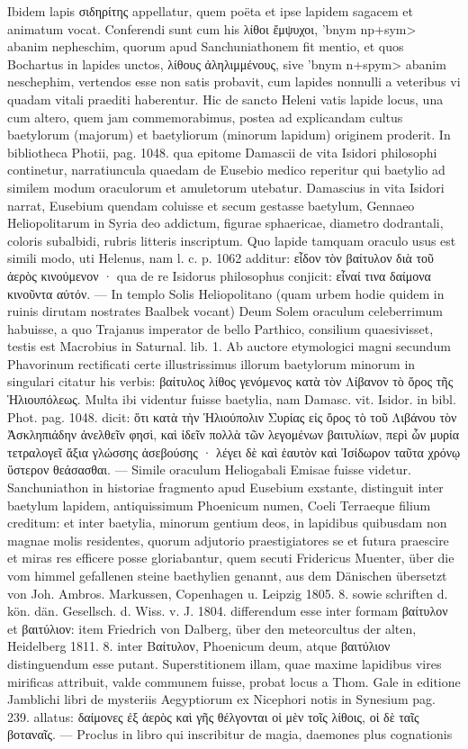 \documentclass[a4paper, 11pt, oneside, polutonikogreek, german]{article}
\begin{document}
\hspace*{0mm}Ibidem lapis σιδηρίτης appellatur, quem poëta et ipse lapidem sagacem et animatum vocat. Conferendi sunt cum his λίθοι ἔμψυχοι, \<'bnym np+sym> abanim nepheschim, quorum apud Sanchuniathonem fit mentio, et quos Bochartus in lapides unctos, λίθους ἀληλιμμένους, sive \<'bnym n+spym> abanim neschephim, vertendos esse non satis probavit, cum lapides nonnulli a veteribus vi quadam vitali praediti haberentur. Hic de sancto Heleni vatis lapide locus, una cum altero, quem jam commemorabimus, postea ad explicandam cultus baetylorum (majorum) et baetyliorum (minorum lapidum) originem proderit. In bibliotheca Photii, pag. 1048. qua epitome Damascii de vita Isidori philosophi continetur, narratiuncula quaedam de Eusebio medico reperitur qui baetylio ad similem modum oraculorum et amuletorum utebatur. Damascius in vita Isidori narrat, Eusebium quendam coluisse et secum gestasse baetylum, Gennaeo Heliopolitarum in Syria deo addictum, figurae sphaericae, diametro dodrantali, coloris subalbidi, rubris litteris inscriptum. Quo lapide tamquam oraculo usus est simili modo, uti Helenus, nam l. c. p. 1062 additur: εἶδον τὸν βαίτυλον διὰ τοῦ ἀερὸς κινούμενον · qua de re Isidorus philosophus conjicit: εἶναί τινα δαίμονα κινοῦντα αὐτόν. --- In templo Solis Heliopolitano (quam urbem hodie quidem in ruinis dirutam nostrates Baalbek vocant) Deum Solem oraculum celeberrimum habuisse, a quo Trajanus imperator de bello Parthico, consilium quaesivisset, testis est Macrobius in Saturnal. lib. 1. Ab auctore etymologici magni secundum Phavorinum rectificati certe illustrissimus illorum baetylorum minorum in singulari citatur his verbis: βαίτυλος λίθος γενόμενος κατὰ τὸν Λίβανον τὸ ὄρος τῆς Ἡλιουπόλεως. Multa ibi videntur fuisse baetylia, nam Damasc. vit. Isidor. in bibl. Phot. pag. 1048. dicit: ὅτι κατὰ τὴν Ἡλιούπολιν Συρίας εἰς ὄρος τὸ τοῦ Λιβάνου τὸν Ἀσκληπιάδην ἀνελθεῖν φησὶ, καὶ ἰδεῖν πολλὰ τῶν λεγομένων βαιτυλίων, περὶ ὧν μυρία τετραλογεῖ ἄξια γλώσσης ἀσεβούσης · λέγει δὲ καὶ ἑαυτὸν καὶ Ἰσίδωρον ταῦτα χρόνῳ ὕστερον θεάσασθαι. --- Simile oraculum Heliogabali Emisae fuisse videtur. Sanchuniathon in historiae fragmento apud Eusebium exstante, distinguit inter baetylum lapidem, antiquissimum Phoenicum numen, Coeli Terraeque filium creditum: et inter baetylia, minorum gentium deos, in lapidibus quibusdam non magnae molis residentes, quorum adjutorio praestigiatores se et futura praescire et miras res efficere posse gloriabantur, quem secuti Fridericus Muenter, über die vom himmel gefallenen steine baethylien genannt, aus dem Dänischen übersetzt von Joh. Ambros. Markussen, Copenhagen u. Leipzig 1805. 8. sowie schriften d. kön. dän. Gesellsch. d. Wiss. v. J. 1804. differendum esse inter formam βαίτυλον et βαιτύλιον: item Friedrich von Dalberg, über den meteorcultus der alten, Heidelberg 1811. 8. inter Βαίτυλον, Phoenicum deum, atque βαιτύλιον distinguendum esse putant. Superstitionem illam, quae maxime lapidibus vires mirificas attribuit, valde communem fuisse, probat locus a Thom. Gale in editione Jamblichi libri de mysteriis Aegyptiorum ex Nicephori notis in Synesium pag. 239. allatus: δαίμονες ἐξ ἀερὸς καὶ γῆς θέλγονται οἱ μὲν τοῖς λίθοις, οἱ δὲ ταῖς βοταναῖς. --- Proclus in libro qui inscribitur de magia, daemones plus cognationis 
\end{document}
